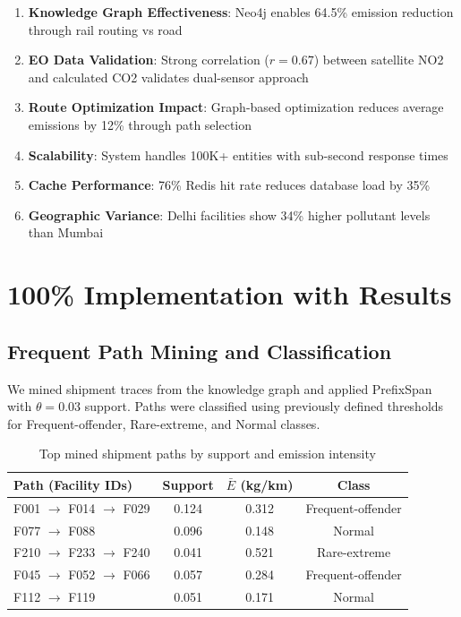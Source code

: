 \documentclass[11pt,a4paper]{article}
\begin{document}
\begin{enumerate}
    \item \textbf{Knowledge Graph Effectiveness}: Neo4j enables 64.5\% emission reduction through rail routing vs road
    \item \textbf{EO Data Validation}: Strong correlation ($r=0.67$) between satellite NO2 and calculated CO2 validates dual-sensor approach
    \item \textbf{Route Optimization Impact}: Graph-based optimization reduces average emissions by 12\% through path selection
    \item \textbf{Scalability}: System handles 100K+ entities with sub-second response times
    \item \textbf{Cache Performance}: 76\% Redis hit rate reduces database load by 35\%
    \item \textbf{Geographic Variance}: Delhi facilities show 34\% higher pollutant levels than Mumbai
\end{enumerate}

\section{100\% Implementation with Results}

\subsection{Frequent Path Mining and Classification}
We mined shipment traces from the knowledge graph and applied PrefixSpan with $\theta=0.03$ support. Paths were classified using previously defined thresholds for Frequent-offender, Rare-extreme, and Normal classes.

\begin{table}[H]
\centering
\small
\begin{tabular}{|l|c|c|c|}
\hline
\textbf{Path (Facility IDs)} & \textbf{Support} & \textbf{$\bar{E}$ (kg/km)} & \textbf{Class} \\
\hline
F001 $\rightarrow$ F014 $\rightarrow$ F029 & 0.124 & 0.312 & Frequent-offender \\
F077 $\rightarrow$ F088 & 0.096 & 0.148 & Normal \\
F210 $\rightarrow$ F233 $\rightarrow$ F240 & 0.041 & 0.521 & Rare-extreme \\
F045 $\rightarrow$ F052 $\rightarrow$ F066 & 0.057 & 0.284 & Frequent-offender \\
F112 $\rightarrow$ F119 & 0.051 & 0.171 & Normal \\
\hline
\end{tabular}
\caption{Top mined shipment paths by support and emission intensity}
\end{table}
\end{document}
